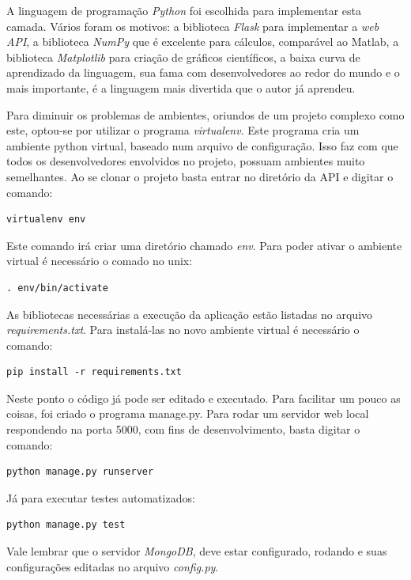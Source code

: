 A linguagem de programação \emph{Python} foi escolhida para implementar esta camada. Vários foram os motivos: a biblioteca \emph{Flask} para implementar a \emph{web API}, a biblioteca \emph{NumPy} que é excelente para cálculos, comparável ao Matlab, a biblioteca \emph{Matplotlib} para criação de gráficos científicos, a baixa curva de aprendizado da linguagem, sua fama com desenvolvedores ao redor do mundo e o mais importante, é a linguagem mais divertida que o autor já aprendeu.

Para diminuir os problemas de ambientes, oriundos de um projeto complexo como este, optou-se por utilizar o programa \emph{virtualenv}. Este programa cria um ambiente python virtual, baseado num arquivo de configuração. Isso faz com que todos os desenvolvedores envolvidos no projeto, possuam ambientes muito semelhantes.
Ao se clonar o projeto basta entrar no diretório da API e digitar o comando:
\lstset{language=bash}
\begin{lstlisting}[frame=single]
virtualenv env
\end{lstlisting}

Este comando irá criar uma diretório chamado \emph{env}. Para poder ativar o ambiente virtual é necessário o comado no unix:
\lstset{language=bash}
\begin{lstlisting}[frame=single]
. env/bin/activate
\end{lstlisting}

As bibliotecas necessárias a execução da aplicação estão listadas no arquivo \emph{requirements.txt}. Para instalá-las no novo ambiente virtual é necessário o comando:
\lstset{language=bash}
\begin{lstlisting}[frame=single]
pip install -r requirements.txt
\end{lstlisting}

Neste ponto o código já pode ser editado e executado. Para facilitar um pouco as coisas, foi criado o programa manage.py. Para rodar um servidor web local respondendo na porta 5000, com fins de desenvolvimento, basta digitar o comando:
\lstset{language=bash}
\begin{lstlisting}[frame=single]
python manage.py runserver
\end{lstlisting}

Já para executar testes automatizados:
\lstset{language=bash}
\begin{lstlisting}[frame=single]
python manage.py test
\end{lstlisting}

Vale lembrar que o servidor \emph{MongoDB}, deve estar configurado, rodando e suas configurações editadas no arquivo \emph{config.py}.


